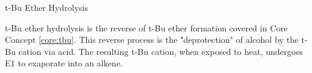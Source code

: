 \documentclass[10pt]{article}
\begin{document}
  \begin{core}{t-Bu Ether Hydrolysis}

    t-Bu ether hydrolysis is the reverse of t-Bu ether formation covered in Core Concept \ref{core:tbu}. This reverse process is the "deprotection" of alcohol  by the t-Bu cation via acid. The resulting t-Bu cation, when exposed to heat, undergoes E1 to exaporate into an alkene.

 
  \end{core}
\end{document}
